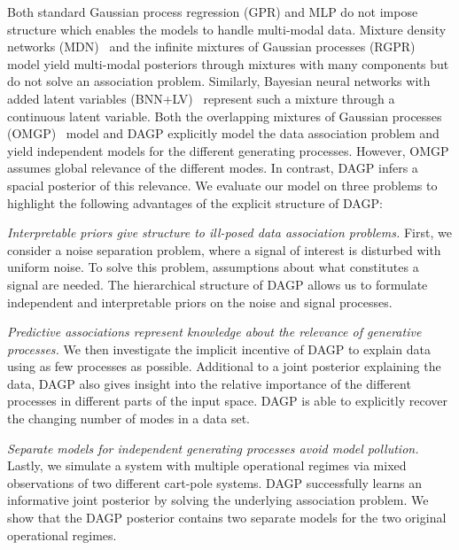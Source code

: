 Both standard Gaussian process regression (GPR) and MLP do not impose structure which enables the models to handle multi-modal data.
Mixture density networks (MDN)~\parencite{bishop_mixture_1994} and the infinite mixtures of Gaussian processes (RGPR)~\parencite{rasmussen_infinite_2002} model yield multi-modal posteriors through mixtures with many components but do not solve an association problem.
Similarly, Bayesian neural networks with added latent variables (BNN+LV)~\parencite{depeweg_learning_2016} represent such a mixture through a continuous latent variable.
Both the overlapping mixtures of Gaussian processes (OMGP)~\parencite{lazaro-gredilla_overlapping_2012} model and DAGP explicitly model the data association problem and yield independent models for the different generating processes.
However, OMGP assumes global relevance of the different modes.
In contrast, DAGP infers a spacial posterior of this relevance.
We evaluate our model on three problems to highlight the following advantages of the explicit structure of DAGP:

\emph{Interpretable priors give structure to ill-posed data association problems.}
First, we consider a noise separation problem, where a signal of interest is disturbed with uniform noise.
To solve this problem, assumptions about what constitutes a signal are needed.
The hierarchical structure of DAGP allows us to formulate independent and interpretable priors on the noise and signal processes.

\emph{Predictive associations represent knowledge about the relevance of generative processes.}
We then investigate the implicit incentive of DAGP to explain data using as few processes as possible.
Additional to a joint posterior explaining the data, DAGP also gives insight into the relative importance of the different processes in different parts of the input space.
DAGP is able to explicitly recover the changing number of modes in a data set.

\emph{Separate models for independent generating processes avoid model pollution.}
Lastly, we simulate a system with multiple operational regimes via mixed observations of two different cart-pole systems.
DAGP successfully learns an informative joint posterior by solving the underlying association problem.
We show that the DAGP posterior contains two separate models for the two original operational regimes.


